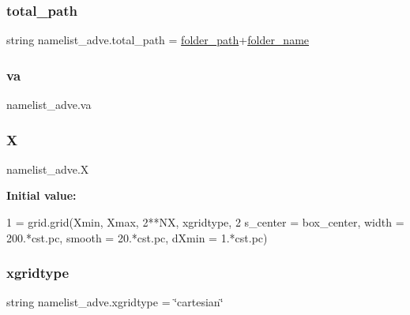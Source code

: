 \subsubsection{\texorpdfstring{total\+\_\+path}{total\_path}}
{\footnotesize\ttfamily string namelist\+\_\+adve.\+total\+\_\+path = \hyperlink{namespacenamelist__adve_af594fa1c116bd203cc6912a56193c7a4}{folder\+\_\+path}+\hyperlink{namespacenamelist__adve_a57db1b9f7ed5af1ca8879a98193fd7dd}{folder\+\_\+name}}

\mbox{\label{namespacenamelist__adve_aafdaf236f53bbfd82a7bb9cbfbab7500}} 
\subsubsection{\texorpdfstring{va}{va}}
{\footnotesize\ttfamily namelist\+\_\+adve.\+va}

\mbox{\label{namespacenamelist__adve_a7c084d4cf829c4197dab8dd1734b185b}} 
\subsubsection{\texorpdfstring{X}{X}}
{\footnotesize\ttfamily namelist\+\_\+adve.\+X}

{\bfseries Initial value\+:}
\begin{DoxyCode}
1 =  grid.grid(Xmin, Xmax, 2**NX, xgridtype, 
2               s\_center = box\_center, width = 200.*cst.pc, smooth = 20.*cst.pc, dXmin = 1.*cst.pc)
\end{DoxyCode}
\mbox{\label{namespacenamelist__adve_a79b0e2e3e65253b723ea468d60d096ae}} 
\subsubsection{\texorpdfstring{xgridtype}{xgridtype}}
{\footnotesize\ttfamily string namelist\+\_\+adve.\+xgridtype = \char`\"{}cartesian\char`\"{}}

\mbox{\label{namespacenamelist__adve_ab6e8516e37ce0cb0d7f967b71f6b2735}} 
